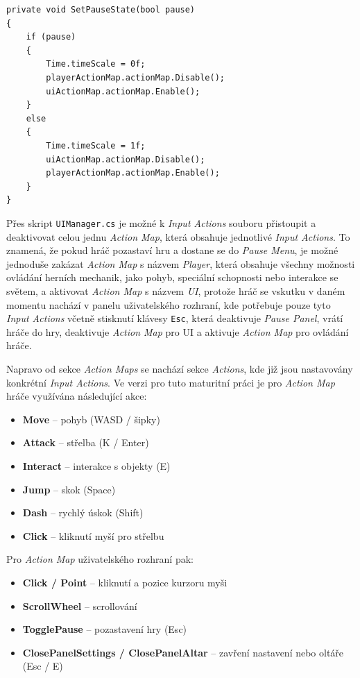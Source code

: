 \begin{lstlisting}[caption={Moderní řešení pozastavení pomocí Input System}, label={lst:pause-code-new}]
private void SetPauseState(bool pause)
{
    if (pause)
    {
        Time.timeScale = 0f;
        playerActionMap.actionMap.Disable();
        uiActionMap.actionMap.Enable();
    }
    else
    {
        Time.timeScale = 1f;
        uiActionMap.actionMap.Disable();
        playerActionMap.actionMap.Enable();
    }
}
\end{lstlisting}

Přes skript \texttt{UIManager.cs} je možné k \emph{Input Actions} souboru přistoupit a deaktivovat celou jednu \emph{Action Map}, která obsahuje jednotlivé \emph{Input Actions}. To znamená, že pokud hráč pozastaví hru a dostane se do \emph{Pause Menu}, je možné jednoduše zakázat \emph{Action Map} s názvem \emph{Player}, která obsahuje všechny možnosti ovládání herních mechanik, jako pohyb, speciální schopnosti nebo interakce se světem, a aktivovat \emph{Action Map} s názvem \emph{UI}, protože hráč se vskutku v daném momentu nachází v panelu uživatelského rozhraní, kde potřebuje pouze tyto \emph{Input Actions} včetně stisknutí klávesy \texttt{Esc}, která deaktivuje \emph{Pause Panel}, vrátí hráče do hry, deaktivuje \emph{Action Map} pro UI a aktivuje \emph{Action Map} pro ovládání hráče.

Napravo od sekce \emph{Action Maps} se nachází sekce \emph{Actions}, kde již jsou nastavovány konkrétní \emph{Input Actions}. Ve verzi pro tuto maturitní práci je pro \emph{Action Map} hráče využívána následující akce:

\begin{itemize}
    \item \textbf{Move} -- pohyb (WASD / šipky)
    \item \textbf{Attack} -- střelba (K / Enter)
    \item \textbf{Interact} -- interakce s objekty (E)
    \item \textbf{Jump} -- skok (Space)
    \item \textbf{Dash} -- rychlý úskok (Shift)
    \item \textbf{Click} -- kliknutí myší pro střelbu
\end{itemize}

Pro \emph{Action Map} uživatelského rozhraní pak:

\begin{itemize}
    \item \textbf{Click / Point} -- kliknutí a pozice kurzoru myši
    \item \textbf{ScrollWheel} -- scrollování
    \item \textbf{TogglePause} -- pozastavení hry (Esc)
    \item \textbf{ClosePanelSettings / ClosePanelAltar} -- zavření nastavení nebo oltáře (Esc / E)
\end{itemize}

